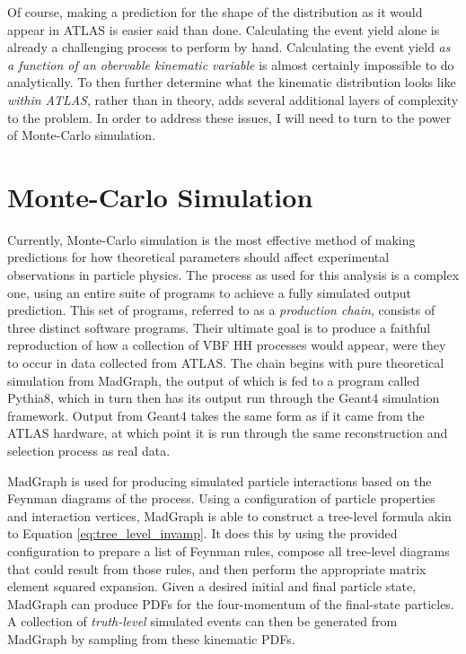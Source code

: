     Of course, making a prediction for the shape of the \mhh distribution as it would appear in ATLAS is easier said than done.
    Calculating the event yield alone is already a challenging process to perform by hand.
    Calculating the event yield \textit{as a function of an obervable kinematic variable} is almost certainly impossible to do analytically.
    To then further determine what the kinematic distribution looks like \textit{within ATLAS}, rather than in theory,
        adds several additional layers of complexity to the problem.
    In order to address these issues, I will need to turn to the power of Monte-Carlo simulation.


\section{Monte-Carlo Simulation} \label{sec:mcsim}
    
    Currently, Monte-Carlo simulation is the most effective method of making predictions
        for how theoretical parameters should affect experimental observations in particle physics.
    The process as used for this analysis is a complex one, using an entire suite of programs to achieve a fully simulated output prediction.
    This set of programs, referred to as a \textit{production chain}, consists of three distinct software programs.
    Their ultimate goal is to produce a faithful reproduction of how a collection of VBF \to HH processes would appear,
        were they to occur in data collected from ATLAS.
    The chain begins with pure theoretical simulation from MadGraph,
        the output of which is fed to a program called Pythia8,
        which in turn then has its output run through the Geant4 simulation framework.
    Output from Geant4 takes the same form as if it came from the ATLAS hardware,
        at which point it is run through the same reconstruction and selection process as real data.

    MadGraph is used for producing simulated particle interactions based on the Feynman diagrams of the process.
    Using a configuration of particle properties and interaction vertices,
        MadGraph is able to construct a tree-level formula akin to Equation \ref{eq:tree_level_invamp}.
    It does this by using the provided configuration to prepare a list of Feynman rules,
        compose all tree-level diagrams that could result from those rules,
        and then perform the appropriate matrix element squared expansion.
    Given a desired initial and final particle state,
        MadGraph can produce PDFs for the four-momentum of the final-state particles.
    A collection of \textit{truth-level} simulated events can then be generated from MadGraph
        by sampling from these kinematic PDFs.

